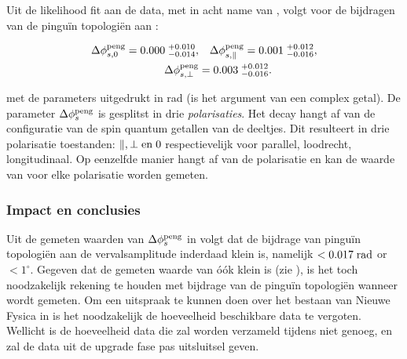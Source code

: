 Uit de likelihood fit aan de data, met in acht name van \cite{Fleischer:1999zi,Faller:2008gt,DeBruyn:2014oga,DeBruyn-thesis},
volgt voor de bijdragen van de pingu\"in topologi\"en aan \phis:


\begin{align}
\label{app_nl_delta_phis_result}
  \Delta\phi^{\rm peng}_{s,{0}}         = 0.000 \; ^{+0.010}_{-0.014}, &\quad  \Delta\phi^{\rm peng}_{s,{\parallel}} = 0.001 \; ^{+0.012}_{-0.016}, \nonumber \\
  \Delta\phi^{\rm peng}_{s,{\perp}}     &= 0.003 \; ^{+0.012}_{-0.016}.
\end{align}


\noindent met de parameters uitgedrukt in rad (\phis is het argument van een complex getal).
De parameter $\Delta\phi_{s}^{\tiny\text{peng}}$ is gesplitst in drie {\it polarisaties}.
Het decay  \BsJpsiPhi hangt af van de configuratie van de spin quantum getallen van de deeltjes.
Dit resulteert in drie polarisatie toestanden: $\parallel,\perp {\rm en}\; 0$ respectievelijk voor parallel,
loodrecht, longitudinaal. Op eenzelfde manier hangt \phis af van de polarisatie en kan de waarde van \phis voor
elke polarisatie worden gemeten.

\subsubsection{Impact en conclusies}
Uit de gemeten waarden van $\Delta\phi_{s}^{\tiny\text{peng}}$ in  volgt dat de bijdrage
van pingu\"in topologi\"en aan de \BsJpsiPhi vervalsamplitude inderdaad klein is, namelijk  $<0.017 \; {\rm rad}$ or $<1^\circ$.
Gegeven dat de gemeten waarde van \phis \'o\'ok klein is (zie ), is het toch noodzakelijk rekening te
houden met bijdrage van de pingu\"in topologi\"en wanneer \phis wordt gemeten. Om een uitspraak te kunnen doen over het bestaan
van Nieuwe Fysica in \phis is het noodzakelijk de hoeveelheid beschikbare data te vergoten. Wellicht is de hoeveelheid data die
zal worden verzameld tijdens \lhcb \runtwo niet genoeg, en zal de data uit de upgrade fase pas uitsluitsel geven.
